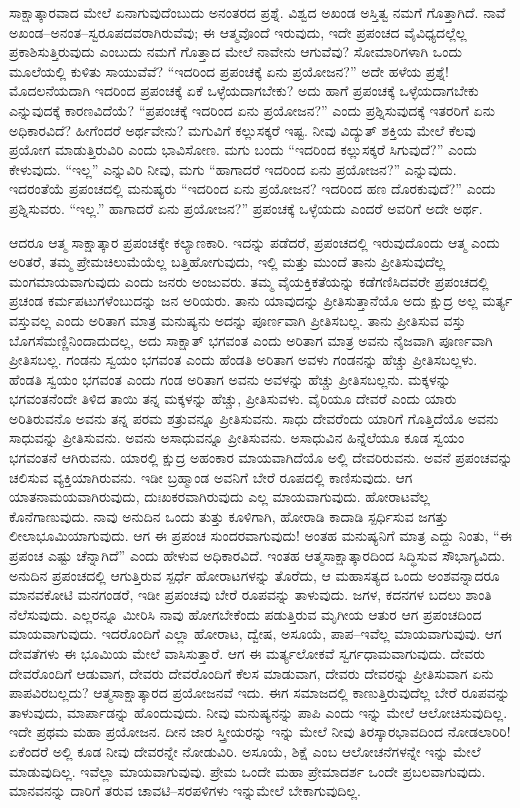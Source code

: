 ಸಾಕ್ಷಾತ್ಕಾರವಾದ ಮೇಲೆ ಏನಾಗುವುದೆಂಬುದು ಅನಂತರದ ಪ್ರಶ್ನೆ. ವಿಶ್ವದ ಅಖಂಡ ಅಸ್ತಿತ್ವ ನಮಗೆ ಗೊತ್ತಾಗಿದೆ. ನಾವೆ ಅಖಂಡ–ಅನಂತ–ಸ್ವರೂಪದವರಾಗಿರುವೆವು; ಈ ಆತ್ಮವೊಂದೆ ಇರುವುದು, ಇದೇ ಪ್ರಪಂಚದ ವೈವಿಧ್ಯದಲ್ಲೆಲ್ಲ ಪ್ರಕಾಶಿಸುತ್ತಿರುವುದು ಎಂಬುದು ನಮಗೆ ಗೊತ್ತಾದ ಮೇಲೆ ನಾವೇನು ಆಗುವೆವು? ಸೋಮಾರಿಗಳಾಗಿ ಒಂದು ಮೂಲೆಯಲ್ಲಿ ಕುಳಿತು ಸಾಯುವೆವೆ? “ಇದರಿಂದ ಪ್ರಪಂಚಕ್ಕೆ ಏನು ಪ್ರಯೋಜನ?” ಅದೇ ಹಳೆಯ ಪ್ರಶ್ನೆ! ಮೊದಲನೆಯದಾಗಿ ಇದರಿಂದ ಪ್ರಪಂಚಕ್ಕೆ ಏಕೆ ಒಳ್ಳೆಯದಾಗಬೇಕು? ಅದು ಹಾಗೆ ಪ್ರಪಂಚಕ್ಕೆ ಒಳ್ಳೆಯದಾಗಬೇಕು ಎನ್ನುವುದಕ್ಕೆ ಕಾರಣವಿದೆಯೆ? “ಪ್ರಪಂಚಕ್ಕೆ ಇದರಿಂದ ಏನು ಪ್ರಯೋಜನ?” ಎಂದು ಪ್ರಶ್ನಿಸುವುದಕ್ಕೆ ಇತರರಿಗೆ ಏನು ಅಧಿಕಾರವಿದೆ? ಹೀಗೆಂದರೆ ಅರ್ಥವೇನು? ಮಗುವಿಗೆ ಕಲ್ಲುಸಕ್ಕರೆ ಇಷ್ಟ. ನೀವು ವಿದ್ಯುತ್​ ಶಕ್ತಿಯ ಮೇಲೆ ಕೆಲವು ಪ್ರಯೋಗ ಮಾಡುತ್ತಿರುವಿರಿ ಎಂದು ಭಾವಿಸೋಣ. ಮಗು ಬಂದು “ಇದರಿಂದ ಕಲ್ಲುಸಕ್ಕರೆ ಸಿಗುವುದೆ?” ಎಂದು ಕೇಳುವುದು. “ಇಲ್ಲ” ಎನ್ನುವಿರಿ ನೀವು, ಮಗು “ಹಾಗಾದರೆ ಇದರಿಂದ ಏನು ಪ್ರಯೋಜನ?” ಎನ್ನುವುದು. ಇದರಂತೆಯೆ ಪ್ರಪಂಚದಲ್ಲಿ ಮನುಷ್ಯರು “ಇದರಿಂದ ಏನು ಪ್ರಯೋಜನ? ಇದರಿಂದ ಹಣ ದೊರಕುವುದೆ?” ಎಂದು ಪ್ರಶ್ನಿಸುವರು. “ಇಲ್ಲ.” ಹಾಗಾದರೆ ಏನು ಪ್ರಯೋಜನ?” ಪ್ರಪಂಚಕ್ಕೆ ಒಳ್ಳೆಯದು ಎಂದರೆ ಅವರಿಗೆ ಅದೇ ಅರ್ಥ.

ಆದರೂ ಆತ್ಮ ಸಾಕ್ಷಾತ್ಕಾರ ಪ್ರಪಂಚಕ್ಕೇ ಕಲ್ಯಾಣಕಾರಿ. ಇದನ್ನು ಪಡೆದರೆ, ಪ್ರಪಂಚದಲ್ಲಿ ಇರುವುದೊಂದು ಆತ್ಮ ಎಂದು ಅರಿತರೆ, ತಮ್ಮ ಪ್ರೇಮಚಿಲುಮೆಯೆಲ್ಲ ಬತ್ತಿಹೋಗುವುದು, ಇಲ್ಲಿ ಮತ್ತು ಮುಂದೆ ತಾನು ಪ್ರೀತಿಸುವುದೆಲ್ಲ ಮಂಗಮಾಯವಾಗುವುದು ಎಂದು ಜನರು ಅಂಜುವರು. ತಮ್ಮ ವೈಯಕ್ತಿಕತೆಯನ್ನು ಕಡೆಗಣಿಸಿದವರೇ ಪ್ರಪಂಚದಲ್ಲಿ ಪ್ರಚಂಡ ಕರ್ಮಪಟುಗಳೆಂಬುದನ್ನು ಜನ ಅರಿಯರು. ತಾನು ಯಾವುದನ್ನು ಪ್ರೀತಿಸುತ್ತಾನೆಯೊ ಅದು ಕ್ಷುದ್ರ ಅಲ್ಲ ಮರ್ತ್ಯ ವಸ್ತುವಲ್ಲ ಎಂದು ಅರಿತಾಗ ಮಾತ್ರ ಮನುಷ್ಯನು ಅದನ್ನು ಪೂರ್ಣವಾಗಿ ಪ್ರೀತಿಸಬಲ್ಲ. ತಾನು ಪ್ರೀತಿಸುವ ವಸ್ತು ಬೊಗಸೆಮಣ್ಣಿನಿಂದಾದುದಲ್ಲ, ಅದು ಸಾಕ್ಷಾತ್​ ಭಗವಂತ ಎಂದು ಅರಿತಾಗ ಮಾತ್ರ ಅವನು ನೈಜವಾಗಿ ಪೂರ್ಣವಾಗಿ ಪ್ರೀತಿಸಬಲ್ಲ. ಗಂಡನು ಸ್ವಯಂ ಭಗವಂತ ಎಂದು ಹೆಂಡತಿ ಅರಿತಾಗ ಅವಳು ಗಂಡನನ್ನು ಹೆಚ್ಚು ಪ್ರೀತಿಸಬಲ್ಲಳು. ಹೆಂಡತಿ ಸ್ವಯಂ ಭಗವಂತ ಎಂದು ಗಂಡ ಅರಿತಾಗ ಅವನು ಅವಳನ್ನು ಹೆಚ್ಚು ಪ್ರೀತಿಸಬಲ್ಲನು. ಮಕ್ಕಳನ್ನು ಭಗವಂತನೆಂದೇ ತಿಳಿದ ತಾಯಿ ತನ್ನ ಮಕ್ಕಳನ್ನು ಹೆಚ್ಚು, ಪ್ರೀತಿಸುವಳು. ವೈರಿಯೂ ದೇವರೆ ಎಂದು ಯಾರು ಅರಿತಿರುವನೊ ಅವನು ತನ್ನ ಪರಮ ಶತ್ರುವನ್ನೂ ಪ್ರೀತಿಸುವನು. ಸಾಧು ದೇವರೆಂದು ಯಾರಿಗೆ ಗೊತ್ತಿದೆಯೊ ಅವನು ಸಾಧುವನ್ನು ಪ್ರೀತಿಸುವನು. ಅವನು ಅಸಾಧುವನ್ನೂ ಪ್ರೀತಿಸುವನು. ಅಸಾಧುವಿನ ಹಿನ್ನೆಲೆಯೂ ಕೂಡ ಸ್ವಯಂ ಭಗವಂತನೆ ಆಗಿರುವನು. ಯಾರಲ್ಲಿ ಕ್ಷುದ್ರ ಅಹಂಕಾರ ಮಾಯವಾಗಿದೆಯೊ ಅಲ್ಲಿ ದೇವರಿರುವನು. ಅವನೆ ಪ್ರಪಂಚವನ್ನು ಚಲಿಸುವ ವ್ಯಕ್ತಿಯಾಗಿರುವನು. ಇಡೀ ಬ್ರಹ್ಮಾಂಡ ಅವನಿಗೆ ಬೇರೆ ರೂಪದಲ್ಲಿ ಕಾಣಿಸುವುದು. ಆಗ ಯಾತನಾಮಯವಾಗಿರುವುದು, ದುಃಖಕರವಾಗಿರುವುದು ಎಲ್ಲ ಮಾಯವಾಗುವುದು. ಹೋರಾಟವೆಲ್ಲ ಕೊನೆಗಾಣುವುದು. ನಾವು ಅನುದಿನ ಒಂದು ತುತ್ತು ಕೂಳಿಗಾಗಿ, ಹೋರಾಡಿ ಕಾದಾಡಿ ಸ್ಪರ್ಧಿಸುವ ಜಗತ್ತು ಲೀಲಾಭೂಮಿಯಾಗುವುದು. ಆಗ ಈ ಪ್ರಪಂಚ ಸುಂದರವಾಗುವುದು! ಅಂತಹ ಮನುಷ್ಯನಿಗೆ ಮಾತ್ರ ಎದ್ದು ನಿಂತು, “ಈ ಪ್ರಪಂಚ ಎಷ್ಟು ಚೆನ್ನಾಗಿದೆ” ಎಂದು ಹೇಳುವ ಅಧಿಕಾರವಿದೆ. ಇಂತಹ ಆತ್ಮಸಾಕ್ಷಾತ್ಕಾರದಿಂದ ಸಿದ್ಧಿಸುವ ಸೌಭಾಗ್ಯವಿದು. ಅನುದಿನ ಪ್ರಪಂಚದಲ್ಲಿ ಆಗುತ್ತಿರುವ ಸ್ಪರ್ಧೆ ಹೋರಾಟಗಳನ್ನು ತೊರೆದು, ಆ ಮಹಾಸತ್ಯದ ಒಂದು ಅಂಶವನ್ನಾದರೂ ಮಾನವಕೋಟಿ ಮನಗಂಡರೆ, ಇಡೀ ಪ್ರಪಂಚವು ಬೇರೆ ರೂಪವನ್ನು ತಾಳುವುದು. ಜಗಳ, ಕದನಗಳ ಬದಲು ಶಾಂತಿ ನೆಲೆಸುವುದು. ಎಲ್ಲರನ್ನೂ ಮೀರಿಸಿ ನಾವು ಹೋಗಬೇಕೆಂದು ಪಡುತ್ತಿರುವ ಮೃಗೀಯ ಆತುರ ಆಗ ಪ್ರಪಂಚದಿಂದ ಮಾಯವಾಗುವುದು. ಇದರೊಂದಿಗೆ ಎಲ್ಲಾ ಹೋರಾಟ, ದ್ವೇಷ, ಅಸೂಯೆ, ಪಾಪ–ಇವೆಲ್ಲ ಮಾಯವಾಗುವುವು. ಆಗ ದೇವತೆಗಳು ಈ ಭೂಮಿಯ ಮೇಲೆ ವಾಸಿಸುತ್ತಾರೆ. ಆಗ ಈ ಮರ್ತ್ಯಲೋಕವೆ ಸ್ವರ್ಗಧಾಮವಾಗುವುದು. ದೇವರು ದೇವರೊಂದಿಗೆ ಆಡುವಾಗ, ದೇವರು ದೇವರೊಂದಿಗೆ ಕೆಲಸ ಮಾಡುವಾಗ, ದೇವರು ದೇವರನ್ನು ಪ್ರೀತಿಸುವಾಗ ಏನು ಪಾಪವಿರಬಲ್ಲದು? ಆತ್ಮಸಾಕ್ಷಾತ್ಕಾರದ ಪ್ರಯೋಜನವೆ ಇದು. ಈಗ ಸಮಾಜದಲ್ಲಿ ಕಾಣುತ್ತಿರುವುದೆಲ್ಲ ಬೇರೆ ರೂಪವನ್ನು ತಾಳುವುದು, ಮಾರ್ಪಾಡನ್ನು ಹೊಂದುವುದು. ನೀವು ಮನುಷ್ಯನನ್ನು ಪಾಪಿ ಎಂದು ಇನ್ನು ಮೇಲೆ ಆಲೋಚಿಸುವುದಿಲ್ಲ. ಇದೇ ಪ್ರಥಮ ಮಹಾ ಪ್ರಯೋಜನ. ದೀನ ಜಾರ ಸ್ತ್ರೀಯರನ್ನು ಇನ್ನು ಮೇಲೆ ನೀವು ತಿರಸ್ಕಾರಭಾವದಿಂದ ನೋಡಲಾರಿರಿ! ಏಕೆಂದರೆ ಅಲ್ಲಿ ಕೂಡ ನೀವು ದೇವರನ್ನೇ ನೋಡುವಿರಿ. ಅಸೂಯೆ, ಶಿಕ್ಷೆ ಎಂಬ ಆಲೋಚನೆಗಳನ್ನೇ ಇನ್ನು ಮೇಲೆ ಮಾಡುವುದಿಲ್ಲ. ಇವೆಲ್ಲಾ ಮಾಯವಾಗುವುವು. ಪ್ರೇಮ ಒಂದೇ ಮಹಾ ಪ್ರೇಮಾದರ್ಶ ಒಂದೇ ಪ್ರಬಲವಾಗುವುದು. ಮಾನವನನ್ನು ದಾರಿಗೆ ತರುವ ಚಾವಟಿ–ಸರಪಳಿಗಳು ಇನ್ನುಮೇಲೆ ಬೇಕಾಗುವುದಿಲ್ಲ.

